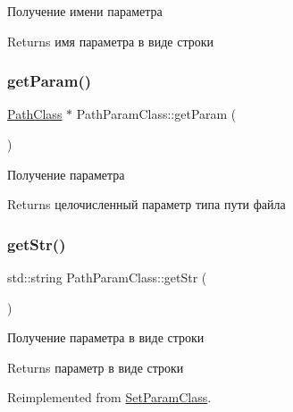 Получение имени параметра 

\begin{DoxyReturn}{Returns}
имя параметра в виде строки 
\end{DoxyReturn}
\mbox{\label{class_path_param_class_a2ba9e408b295705570e381dcb7a72040}} 
\subsubsection{\texorpdfstring{get\+Param()}{getParam()}}
{\footnotesize\ttfamily \hyperlink{class_path_class}{Path\+Class} $\ast$ Path\+Param\+Class\+::get\+Param (\begin{DoxyParamCaption}{ }\end{DoxyParamCaption})}



Получение параметра 

\begin{DoxyReturn}{Returns}
целочисленный параметр типа пути файла 
\end{DoxyReturn}
\mbox{\label{class_path_param_class_ae5ab6701e81608546f1d0c1495355c05}} 
\subsubsection{\texorpdfstring{get\+Str()}{getStr()}}
{\footnotesize\ttfamily std\+::string Path\+Param\+Class\+::get\+Str (\begin{DoxyParamCaption}{ }\end{DoxyParamCaption})\hspace{0.3cm}{\ttfamily [virtual]}}



Получение параметра в виде строки 

\begin{DoxyReturn}{Returns}
параметр в виде строки 
\end{DoxyReturn}


Reimplemented from \hyperlink{class_set_param_class_a44f3924827807beb6805867a0305e8c9}{Set\+Param\+Class}.

\mbox{\label{class_set_param_class_aeabf85ad5a078ab4abb8f09a67f2c8e0}} 
